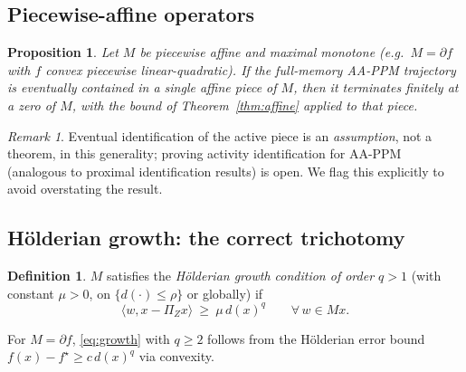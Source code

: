 \documentclass[11pt]{article}
\newtheorem{proposition}[theorem]{Proposition}
\theoremstyle{definition}
\newtheorem{definition}[theorem]{Definition}
\theoremstyle{remark}
\newtheorem{remark}[theorem]{Remark}
\newcommand{\inner}[2]{\langle #1, #2 \rangle}
\begin{document}
\subsection{Piecewise-affine operators}

\begin{proposition}\label{prop:pwa}
Let $M$ be piecewise affine and maximal monotone (e.g.\ $M=\partial f$ with
$f$ convex piecewise linear-quadratic). If the full-memory AA-PPM
trajectory is eventually contained in a single affine piece of $M$, then it
terminates finitely at a zero of $M$, with the bound of
Theorem~\ref{thm:affine} applied to that piece.
\end{proposition}
\begin{remark}
Eventual identification of the active piece is an \emph{assumption}, not a
theorem, in this generality; proving activity identification for AA-PPM
(analogous to proximal identification results) is open. We flag this
explicitly to avoid overstating the result.
\end{remark}

\subsection{H\"olderian growth: the correct trichotomy}

\begin{definition}\label{def:growth}
$M$ satisfies the \emph{H\"olderian growth condition of order $q>1$} (with
constant $\mu>0$, on $\{d(\cdot)\le\rho\}$ or globally) if
\begin{equation}\label{eq:growth}
\inner{w}{x-\Pi_Zx}\ \ge\ \mu\, d(x)^q
\qquad\forall\, w\in Mx .
\end{equation}
\end{definition}

For $M=\partial f$, \eqref{eq:growth} with $q\ge2$ follows from the
H\"olderian error bound $f(x)-f^\star\ge c\,d(x)^q$ via convexity.
\end{document}
